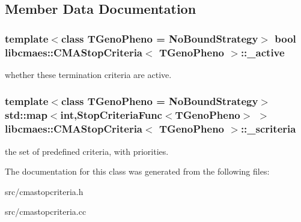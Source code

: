 \subsection{Member Data Documentation}
\hypertarget{classlibcmaes_1_1CMAStopCriteria_a09534d620cfe4c35c03d8a80205346ba}{
\subsubsection[{\-\_\-active}]{\setlength{\rightskip}{0pt plus 5cm}template$<$class T\-Geno\-Pheno = No\-Bound\-Strategy$>$ bool {\bf libcmaes\-::\-C\-M\-A\-Stop\-Criteria}$<$ T\-Geno\-Pheno $>$\-::\-\_\-active}}\label{classlibcmaes_1_1CMAStopCriteria_a09534d620cfe4c35c03d8a80205346ba}
whether these termination criteria are active. \hypertarget{classlibcmaes_1_1CMAStopCriteria_a28799c079f8bccfdbe0df124722dbfa2}{
\subsubsection[{\-\_\-scriteria}]{\setlength{\rightskip}{0pt plus 5cm}template$<$class T\-Geno\-Pheno = No\-Bound\-Strategy$>$ std\-::map$<$int,Stop\-Criteria\-Func$<$T\-Geno\-Pheno$>$ $>$ {\bf libcmaes\-::\-C\-M\-A\-Stop\-Criteria}$<$ T\-Geno\-Pheno $>$\-::\-\_\-scriteria}}\label{classlibcmaes_1_1CMAStopCriteria_a28799c079f8bccfdbe0df124722dbfa2}
the set of predefined criteria, with priorities. 

The documentation for this class was generated from the following files\-:\begin{DoxyCompactItemize}
\item 
src/cmastopcriteria.\-h\item 
src/cmastopcriteria.\-cc\end{DoxyCompactItemize}
